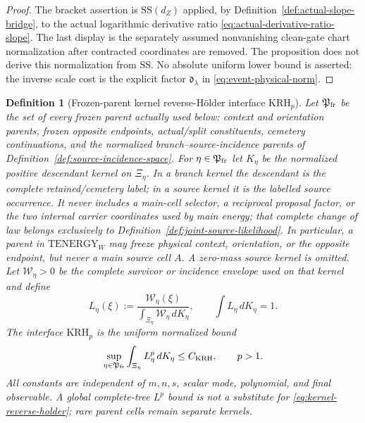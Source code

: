 \documentclass[11pt]{article}
\newtheorem{definition}[theorem]{Definition}
\begin{document}
\begin{proof}
The bracket assertion is $\mathrm{SS}(d_Z)$ applied, by
Definition~\ref{def:actual-slope-bridge}, to the actual logarithmic
derivative ratio \eqref{eq:actual-derivative-ratio-slope}.  The last display
is the separately assumed nonvanishing clean-gate chart normalization after
contracted coordinates are removed.  The proposition does not derive this
normalization from $\mathrm{SS}$.  No absolute uniform lower bound is
asserted: the inverse scale cost is the explicit factor
$\mathfrak d_\lambda$ in \eqref{eq:event-physical-norm}.
\end{proof}

\begin{definition}[Frozen-parent kernel reverse-H\"older interface
$\mathrm{KRH}_{p}$]
\label{def:kernel-reverse-holder}
Let $\mathfrak P_{\rm fr}$ be the set of every frozen parent actually used
below: context and orientation parents, frozen opposite endpoints,
actual/split constituents, cemetery continuations, and the normalized
branch--source-incidence parents of
Definition~\ref{def:source-incidence-space}.  For
$\eta\in\mathfrak P_{\rm fr}$ let $K_\eta$ be the normalized positive
descendant kernel on $\Xi_\eta$.  In a branch kernel the descendant is the
complete retained/cemetery label; in a source kernel it is the labelled
source occurrence.  It never includes a main-cell selector, a reciprocal
proposal factor, or the two internal carrier coordinates used by main
energy; that complete change of law belongs exclusively to
Definition~\ref{def:joint-source-likelihood}.  In particular, a parent in
$\mathrm{TENERGY}_{W}$ may freeze physical context, orientation, or the
opposite endpoint, but never a main source cell $A$.  A zero-mass source
kernel is omitted.  Let
$\mathscr W_\eta>0$ be the complete survivor or incidence envelope used on
that kernel and define
\begin{equation}
\label{eq:kernel-normalized-likelihood}
 L_\eta(\xi):=
 \frac{\mathscr W_\eta(\xi)}
      {\int_{\Xi_\eta}\mathscr W_\eta\,dK_\eta},
 \qquad \int L_\eta\,dK_\eta=1.
\end{equation}
The interface $\mathrm{KRH}_{p}$ is the uniform normalized bound
\begin{equation}
\label{eq:kernel-reverse-holder}
 \sup_{\eta\in\mathfrak P_{\rm fr}}
 \int_{\Xi_\eta}L_\eta^p\,dK_\eta\le C_{\rm KRH},
 \qquad p>1.
\end{equation}
All constants are independent of $m,n,s$, scalar mode, polynomial, and final
observable.  A global complete-tree $L^p$ bound is not a substitute for
\eqref{eq:kernel-reverse-holder}; rare parent cells remain separate kernels.
\end{definition}
\end{document}

